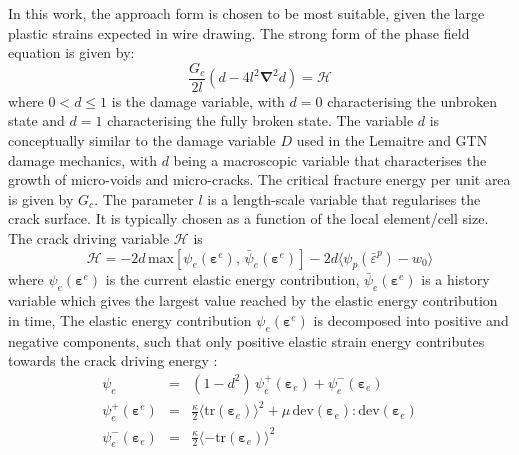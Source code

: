 \documentclass[sn-mathphys,Numbered,draft]{sn-jnl}%
\newcommand{\bb}{\boldsymbol}
\begin{document}
In this work, the approach form \citet{borden_phase-field_2016} is chosen to be most suitable, given the large plastic strains expected in wire drawing.
The strong form of the phase field equation is given by:
\begin{equation} \label{eqn:phaseFieldEquation}
	\frac{G_c}{2l} \left(d - 4 l^2 \bb{\nabla}^2 d \right) = \mathcal{H} %
\end{equation}
where $0 < d \leq 1$ is the damage variable, with $d = 0$ characterising the unbroken state and $d = 1$ characterising the fully broken state. 
The variable $d$ is conceptually similar to the damage variable $D$ used in the Lemaitre and GTN damage mechanics, with $d$ being a macroscopic variable that characterises the growth of micro-voids and micro-cracks.
The critical fracture energy per unit area is given by $G_c$.
The parameter $l$ is a length-scale variable that regularises the crack surface. It is typically chosen as a function of the local element/cell size.
The crack driving variable $\mathcal{H}$ is
\begin{equation}
	\mathcal{H} %
	=
		-2d \,
		\text{max}
		\left[
			\psi_e
			\left(\bb{\varepsilon}^e\right), \,
			\bar{\psi}_{e}\left(\bb{\varepsilon}^e\right)
		\right]
	-2d
	\langle \psi_p({\bar{\varepsilon}}^p)-w_0 \rangle
\end{equation}
where $\psi_e \left(\mathbf{\varepsilon}^e\right)$ is the current elastic energy contribution, $\bar{\psi}_e \left(\mathbf{\varepsilon}^e\right)$ is a history variable which gives the largest value reached by the elastic energy contribution in time, 
The elastic energy contribution $\psi_e \left(\mathbf{\varepsilon}^e\right)$ is decomposed into positive and negative components, such that only positive elastic strain energy contributes towards the crack driving energy \citep{amor_regularized_2009}:
\begin{eqnarray}
	\psi_e &=&
	(1 - d^2) \, \psi_{e}^{+} \left(\bb{\varepsilon}_e \right)
	+ \psi_{e}^{-} \left(\bb{\varepsilon}_e \right) \\
	\psi_e^{+}\left(\bb{\varepsilon}^{e}\right) &=&
	\frac{\kappa}{2} \langle \text{tr}\left(\bb{\varepsilon}_{e}\right)\rangle^2
	+\mu \,\text{dev}(\bb{\varepsilon}_e): \text{dev}(\bb{\varepsilon}_e) \\
    	\psi_e^{-} \left(\bb{\varepsilon}_{e}\right) &=&
	\frac{\kappa}{2} \langle-\text{tr}\left(\bb{\varepsilon}_{e}\right) \rangle^2
\end{eqnarray}
\end{document}
